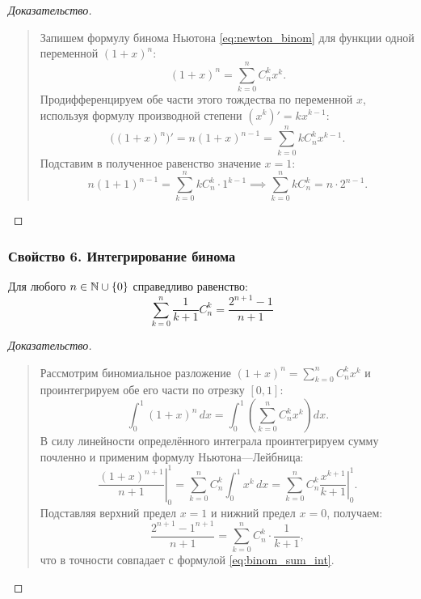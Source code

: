 \begin{proof}[Доказательство]~\\
    \begin{quote}
        Запишем формулу бинома Ньютона \eqref{eq:newton_binom} для 
        функции одной переменной $(1 + x)^n$:
        \[
            (1 + x)^n = \sum_{k=0}^{n} C_n^k x^k.
        \]
        Продифференцируем обе части этого тождества по переменной $x$, 
        используя формулу производной степени $(x^k)' = k x^{k-1}$:
        \[
            \bigl((1 + x)^n\bigr)' = n(1 + x)^{n-1} = 
            \sum_{k=0}^{n} k C_n^k x^{k-1}.
        \]
        Подставим в полученное равенство значение $x = 1$:
        \[
            n(1 + 1)^{n-1} = \sum_{k=0}^{n} k C_n^k \cdot 1^{k-1} \implies 
            \sum_{k=0}^{n} k C_n^k = n \cdot 2^{n-1}.
        \]
    \end{quote}
\end{proof}

\subsubsection{Свойство 6. Интегрирование бинома}

\begin{proposition}
    Для любого $n \in \mathbb{N} \cup \{0\}$ справедливо равенство:
    \begin{equation} \label{eq:binom_sum_int}
        \sum_{k=0}^{n} \frac{1}{k + 1} C_n^k = \frac{2^{n+1} - 1}{n + 1} \tag{8}
    \end{equation}
\end{proposition}

\begin{proof}[Доказательство]~\\
    \begin{quote}
        Рассмотрим биномиальное разложение $(1 + x)^n = \sum_{k=0}^n C_n^k x^k$ 
        и проинтегрируем обе его части по отрезку $[0, 1]$:
        \[
            \int_{0}^{1} (1 + x)^n \, dx = 
            \int_{0}^{1} \left( \sum_{k=0}^{n} C_n^k x^k \right) dx.
        \]
        В силу линейности определённого интеграла проинтегрируем сумму 
        почленно и применим формулу Ньютона---Лейбница:
        \[
            \left. \frac{(1 + x)^{n+1}}{n + 1} \right|_{0}^{1} = 
            \sum_{k=0}^{n} C_n^k \int_{0}^{1} x^k \, dx = 
            \sum_{k=0}^{n} C_n^k \left. \frac{x^{k+1}}{k + 1} \right|_{0}^{1}.
        \]
        Подставляя верхний предел $x = 1$ и нижний предел $x = 0$, получаем:
        \[
            \frac{2^{n+1} - 1^{n+1}}{n + 1} = 
            \sum_{k=0}^{n} C_n^k \cdot \frac{1}{k + 1},
        \]
        что в точности совпадает с формулой \eqref{eq:binom_sum_int}.
    \end{quote}
\end{proof}

